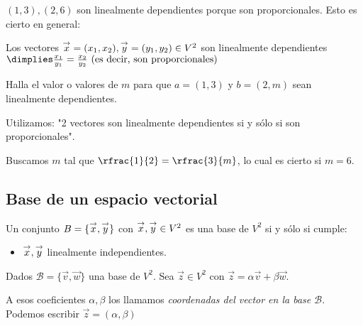 \obs $(1,3),(2,6)$ son linealmente dependientes porque son proporcionales. Esto es cierto en general:

\begin{prop}
Los vectores $\overset{\rightarrow}{x}=(x_1,x_2),\overset{\rightarrow}{y}=(y_1,y_2)\in V^2$ son linealmente dependientes $\dimplies \frac{x_1}{y_1}=\frac{x_2}{y_2} \text{ (es decir, son proporcionales)}$ 
\end{prop}


\begin{problem} Halla el valor o valores de $m$ para que  $a=(1,3)$ y $b=(2,m)$ sean linealmente dependientes.
\solution

Utilizamos: "2 vectores son linealmente dependientes si y sólo si son proporcionales".

Buscamos $m$ tal que $\rfrac{1}{2} = \rfrac{3}{m}$, lo cual es cierto si $m=6$.
\end{problem}


\subsection{Base de un espacio vectorial}


\begin{defn}[Base]
Un conjunto $B=\{\overset{\rightarrow}{x},\overset{\rightarrow}{y}\}$ con $\overset{\rightarrow}{x},\overset{\rightarrow}{y}\in V^2$ es una base de $ V^2$ si y sólo si cumple:

	\begin{itemize}
		\item $\overset{\rightarrow}{x},\overset{\rightarrow}{y}$ linealmente independientes.
	\end{itemize}
\end{defn}


\begin{defn} 
	Dados $\mathcal{B}=\{\vec{v},\vec{w}\}$ una base de $V^2$. Sea $\vec{z}\in V^2$ con $\vec{z} = \alpha \vec{v} + \beta\vec{w}$. 

	A esos coeficientes $\alpha,\beta$ los llamamos \textit{coordenadas del vector en la base $\mathcal{B}$}. 
	Podemos escribir $\vec{z} = (\alpha,\beta)$
\end{defn}


